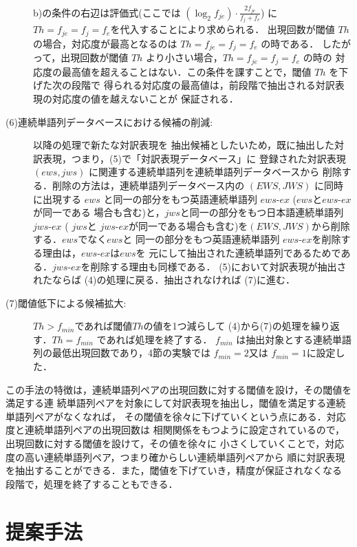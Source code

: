 \begin{description}
b)の条件の右辺は評価式(ここでは $(\log_{2}f_{je})\cdot \frac{2f_{je}}{f_{j}+f_{e}}$) に
$Th=f_{je}=f_{j}=f_{e}$を代入することにより求められる．
出現回数が閾値 $Th$ の場合，対応度が最高となるのは $Th=f_{je}=f_{j}=f_{e}$ の時である．
したがって，出現回数が閾値 $Th$ より小さい場合，$Th=f_{je}=f_{j}=f_{e}$ の時の
対応度の最高値を超えることはない．この条件を課すことで，閾値 $Th$ を下げた次の段階で
得られる対応度の最高値は，前段階で抽出される対訳表現の対応度の値を越えないことが
保証される．

\item[(6)連続単語列データベースにおける候補の削減:] 以降の処理で新たな対訳表現を
抽出候補としたいため，既に抽出した対訳表現，つまり，(5)で「対訳表現データベース」に
登録された対訳表現 $(ews,jws)$ に関連する連続単語列を連続単語列データベースから
削除する．削除の方法は，連続単語列データベース内の $(EWS,JWS)$ に同時に出現する 
$ews$ と同一の部分をもつ英語連続単語列 $ews$-$ex$ ($ews$と$ews$-$ex$が同一である
場合も含む)と，$jws$と同一の部分をもつ日本語連続単語列 $jws$-$ex$ ( $jws$と
$jws$-$ex$が同一である場合も含む)を$(EWS,JWS)$から削除する．$ews$でなく$ews$と
同一の部分をもつ英語連続単語列 $ews$-$ex$を削除する理由は，$ews$-$ex$は$ews$を
元にして抽出された連続単語列であるためである．$jws$-$ex$を削除する理由も同様である．
(5)において対訳表現が抽出されたならば (4)の処理に戻る．抽出されなければ (7)に進む．

\item[(7)閾値低下による候補拡大:] $ Th > f_{min}$であれば閾値$Th$の値を1つ減らして
(4)から(7)の処理を繰り返す．$Th=f_{min}$ であれば処理を終了する．
$f_{min}$ は抽出対象とする連続単語列の最低出現回数であり，4節の実験では $f_{min}=2$又は
$f_{min}=1$に設定した．

\end{description}

\vspace{5mm}

\noindent
この手法の特徴は，連続単語列ペアの出現回数に対する閾値を設け，その閾値を満足する連
続単語列ペアを対象にして対訳表現を抽出し，閾値を満足する連続単語列ペアがなくなれば，
その閾値を徐々に下げていくという点にある．対応度と連続単語列ペアの出現回数は
相関関係をもつように設定されているので，出現回数に対する閾値を設けて，その値を徐々に
小さくしていくことで，対応度の高い連続単語列ペア，つまり確からしい連続単語列ペアから
順に対訳表現を抽出することができる．また，閾値を下げていき，精度が保証されなくなる
段階で，処理を終了することもできる．

\section{提案手法}
\label{提案}

